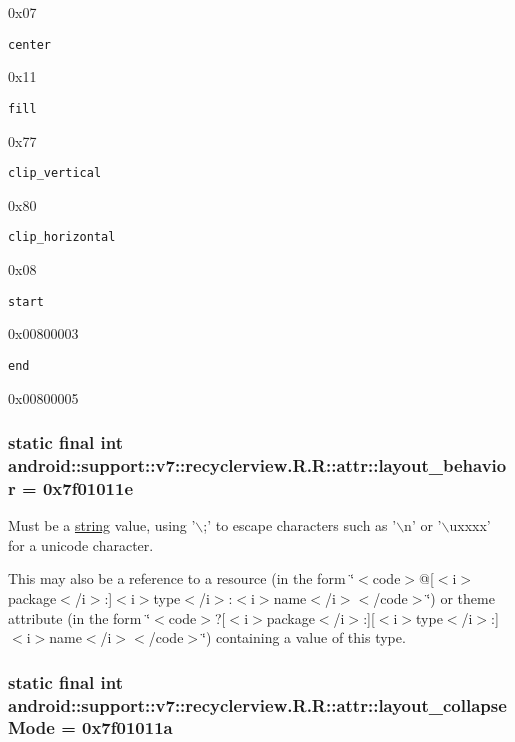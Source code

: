 0x07

{\tt center}

0x11

{\tt fill}

0x77

{\tt clip\_\-vertical}

0x80

{\tt clip\_\-horizontal}

0x08

{\tt start}

0x00800003

{\tt end}

0x00800005\hypertarget{classandroid_1_1support_1_1v7_1_1recyclerview_1_1_r_1_1attr_af774f55b50ff9e67cb69b3b0290879c}{
\subsubsection[{layout\_\-behavior}]{\setlength{\rightskip}{0pt plus 5cm}static final int android::support::v7::recyclerview.R.R::attr::layout\_\-behavior = 0x7f01011e}}
\label{classandroid_1_1support_1_1v7_1_1recyclerview_1_1_r_1_1attr_af774f55b50ff9e67cb69b3b0290879c}


Must be a \hyperlink{classandroid_1_1support_1_1v7_1_1recyclerview_1_1_r_1_1string}{string} value, using '$\backslash$;' to escape characters such as '$\backslash$n' or '$\backslash$uxxxx' for a unicode character. 

This may also be a reference to a resource (in the form \char`\"{}$<$code$>$@\mbox{[}$<$i$>$package$<$/i$>$:\mbox{]}$<$i$>$type$<$/i$>$:$<$i$>$name$<$/i$>$$<$/code$>$\char`\"{}) or theme attribute (in the form \char`\"{}$<$code$>$?\mbox{[}$<$i$>$package$<$/i$>$:\mbox{]}\mbox{[}$<$i$>$type$<$/i$>$:\mbox{]}$<$i$>$name$<$/i$>$$<$/code$>$\char`\"{}) containing a value of this type. \hypertarget{classandroid_1_1support_1_1v7_1_1recyclerview_1_1_r_1_1attr_fcbc093d8e0a9375b53b7c602341093d}{
\subsubsection[{layout\_\-collapseMode}]{\setlength{\rightskip}{0pt plus 5cm}static final int android::support::v7::recyclerview.R.R::attr::layout\_\-collapseMode = 0x7f01011a}}
\label{classandroid_1_1support_1_1v7_1_1recyclerview_1_1_r_1_1attr_fcbc093d8e0a9375b53b7c602341093d}


